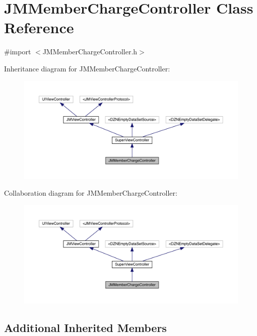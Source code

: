 \hypertarget{interface_j_m_member_charge_controller}{}\section{J\+M\+Member\+Charge\+Controller Class Reference}
\label{interface_j_m_member_charge_controller}


{\ttfamily \#import $<$J\+M\+Member\+Charge\+Controller.\+h$>$}



Inheritance diagram for J\+M\+Member\+Charge\+Controller\+:\nopagebreak
\begin{figure}[H]
\begin{center}
\leavevmode
\includegraphics[width=350pt]{interface_j_m_member_charge_controller__inherit__graph}
\end{center}
\end{figure}


Collaboration diagram for J\+M\+Member\+Charge\+Controller\+:\nopagebreak
\begin{figure}[H]
\begin{center}
\leavevmode
\includegraphics[width=350pt]{interface_j_m_member_charge_controller__coll__graph}
\end{center}
\end{figure}
\subsection*{Additional Inherited Members}


